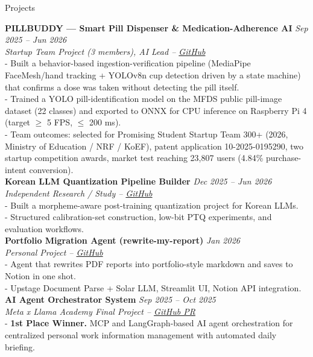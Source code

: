 \documentclass{resume} %
\begin{document}
\begin{rSection}{Projects}

{\bf PILLBUDDY --- Smart Pill Dispenser \& Medication-Adherence AI} \hfill {\em Sep 2025 -- Jun 2026}  
\\{\textit{Startup Team Project (3 members), AI Lead -- \href{https://github.com/choihyun-1110/buddy}{GitHub}}}  
\\- Built a behavior-based ingestion-verification pipeline (MediaPipe FaceMesh/hand tracking + YOLOv8n cup detection driven by a state machine) that confirms a dose was taken without detecting the pill itself.
\\- Trained a YOLO pill-identification model on the MFDS public pill-image dataset (22 classes) and exported to ONNX for CPU inference on Raspberry Pi 4 (target $\geq$ 5 FPS, $\leq$ 200 ms).
\\- Team outcomes: selected for Promising Student Startup Team 300+ (2026, Ministry of Education / NRF / KoEF), patent application 10-2025-0195290, two startup competition awards, market test reaching 23,807 users (4.84\% purchase-intent conversion).
\\

{\bf Korean LLM Quantization Pipeline Builder} \hfill {\em Dec 2025 -- Jun 2026}  
\\{\textit{Independent Research / Study – \href{https://github.com/choihyun-1110/morpheme-aware-ptq}{GitHub}}}  
\\- Built a morpheme-aware post-training quantization project for Korean LLMs.
\\- Structured calibration-set construction, low-bit PTQ experiments, and evaluation workflows.
\\

{\bf Portfolio Migration Agent (rewrite-my-report)} \hfill {\em Jan 2026}  
\\{\textit{Personal Project – \href{https://github.com/choihyun-1110/rewrite-my-report}{GitHub}}}  
\\- Agent that rewrites PDF reports into portfolio-style markdown and saves to Notion in one shot.
\\- Upstage Document Parse + Solar LLM, Streamlit UI, Notion API integration.
\\

{\bf AI Agent Orchestrator System} \hfill {\em Sep 2025 – Oct 2025}  
\\{\textit{Meta x Llama Academy Final Project – \href{https://github.com/UpstageAI/edu-usecase/pull/6}{GitHub PR}}}  
\\- \textbf{1st Place Winner.} MCP and LangGraph-based AI agent orchestration for centralized personal work information management with automated daily briefing.
\\


\end{rSection}
\end{document}
